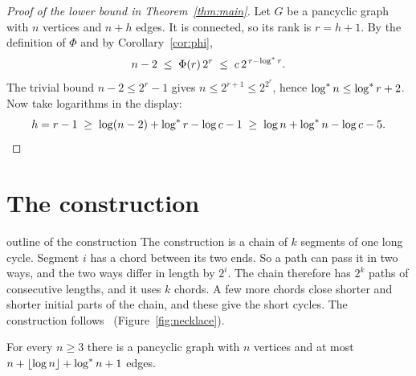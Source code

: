 \documentclass[11pt]{article}
\begin{document}
\begin{proof}[Proof of the lower bound in Theorem~\ref{thm:main}]
Let $G$ be a pancyclic graph with $n$ vertices and $n+h$ edges. It is connected, so its rank is
$r=h+1$. By the definition of $\Phi$ and by Corollary~\ref{cor:phi},
\[
  n-2\;\le\;\Phi(r)\,2^{r}\;\le\;c\,2^{\,r-\log^{*} r}.
\]
The trivial bound $n-2\le2^{r}-1$ gives $n\le2^{r+1}\le2^{2^{r}}$, hence $\log^{*} n\le\log^{*} r+2$. Now
take logarithms in the display:
\[
  h=r-1\;\ge\;\log(n-2)+\log^{*} r-\log c-1\;\ge\;\log n+\log^{*} n-\log c-5.\qedhere
\]
\end{proof}

\section{The construction}\label{sec:upper}

\begin{idea}{outline of the construction}
The construction is a chain of $k$ segments of one long cycle. Segment $i$ has a chord between
its two ends. So a path can pass it in two ways, and the two ways differ in length by $2^{i}$.
The chain therefore has $2^{k}$ paths of consecutive lengths, and it uses $k$ chords. A few more
chords close shorter and shorter initial parts of the chain, and these give the short cycles.
The construction follows~\cite{KNT} (Figure~\ref{fig:necklace}).
\end{idea}

\begin{proposition}\label{prop:upper}
For every $n\ge3$ there is a pancyclic graph with $n$ vertices and at most
$n+\lfloor\log n\rfloor+\log^{*} n+1$ edges.
\end{proposition}
\end{document}
